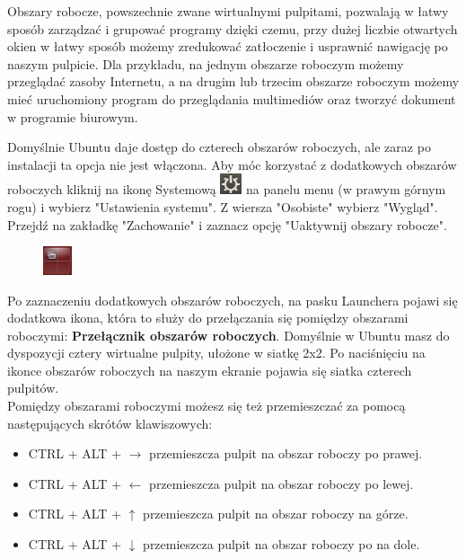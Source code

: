 Obszary robocze, powszechnie zwane wirtualnymi pulpitami, pozwalają w łatwy sposób zarządzać i grupować programy dzięki czemu, przy dużej liczbie otwartych okien w łatwy sposób możemy zredukować zatłoczenie i usprawnić nawigację po naszym pulpicie. Dla przykładu, na jednym obszarze roboczym możemy przeglądać zasoby Internetu, a na drugim lub trzecim obszarze roboczym możemy mieć uruchomiony program do przeglądania multimediów oraz tworzyć dokument w programie biurowym.

Domyślnie Ubuntu daje dostęp do czterech obszarów roboczych, ale zaraz po instalacji ta opcja nie jest włączona. Aby móc korzystać z dodatkowych obszarów roboczych kliknij na ikonę Systemową \includegraphics[scale=1]{images/ikony_zasilanie.png} na panelu menu (w prawym górnym rogu) i wybierz "Ustawienia systemu". Z wiersza "Osobiste" wybierz "Wygląd". Przejdź na zakładkę "Zachowanie" i zaznacz opcję "Uaktywnij obszary robocze".

\begin{figure}
                \includegraphics[width=0.075\textwidth]{images/ikony_obszary_robocze.png}
\end{figure}

Po zaznaczeniu dodatkowych obszarów roboczych, na pasku Launchera pojawi się dodatkowa ikona, która to służy do przełączania się pomiędzy obszarami roboczymi: \textbf{Przełącznik obszarów roboczych}. Domyślnie w Ubuntu masz do dyspozycji cztery wirtualne pulpity, ułożone w siatkę 2x2. Po naciśnięciu na ikonce obszarów roboczych na naszym ekranie pojawia się siatka czterech pulpitów.\\
Pomiędzy obszarami roboczymi możesz się też przemieszczać za pomocą następujących skrótów klawiszowych:
\begin{itemize}
\item CTRL + ALT + $\rightarrow$ przemieszcza pulpit na obszar roboczy po prawej.
\item CTRL + ALT + $\leftarrow$ przemieszcza pulpit na obszar roboczy po lewej.
\item CTRL + ALT + $\uparrow$ przemieszcza pulpit na obszar roboczy na górze.
\item CTRL + ALT + $\downarrow$ przemieszcza pulpit na obszar roboczy po na dole.
\end{itemize}
\clearpage